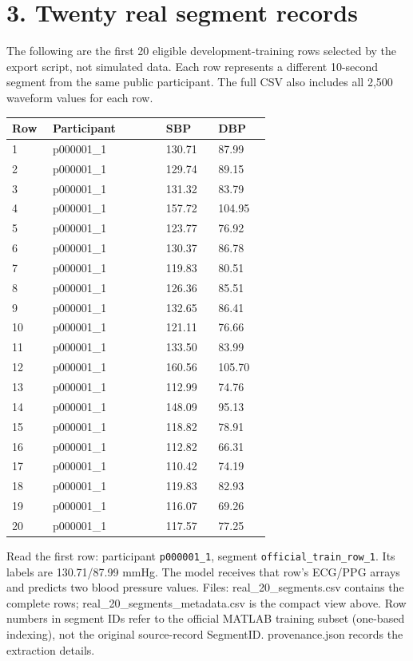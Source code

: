 \documentclass[11pt,letterpaper]{article}
\begin{document}
\section*{3. Twenty real segment records}
The following are the first 20 eligible development-training rows selected by the export script, not simulated data. Each row represents a different 10-second segment from the same public participant. The full CSV also includes all 2,500 waveform values for each row.

\par\smallskip
\begin{tabular}{@{}p{0.14\linewidth}p{0.39\linewidth}p{0.18\linewidth}p{0.18\linewidth}@{}}\toprule
Row & Participant & SBP & DBP\\\midrule
1 & p000001\_1 & 130.71 & 87.99\\
2 & p000001\_1 & 129.74 & 89.15\\
3 & p000001\_1 & 131.32 & 83.79\\
4 & p000001\_1 & 157.72 & 104.95\\
5 & p000001\_1 & 123.77 & 76.92\\
6 & p000001\_1 & 130.37 & 86.78\\
7 & p000001\_1 & 119.83 & 80.51\\
8 & p000001\_1 & 126.36 & 85.51\\
9 & p000001\_1 & 132.65 & 86.41\\
10 & p000001\_1 & 121.11 & 76.66\\
11 & p000001\_1 & 133.50 & 83.99\\
12 & p000001\_1 & 160.56 & 105.70\\
13 & p000001\_1 & 112.99 & 74.76\\
14 & p000001\_1 & 148.09 & 95.13\\
15 & p000001\_1 & 118.82 & 78.91\\
16 & p000001\_1 & 112.82 & 66.31\\
17 & p000001\_1 & 110.42 & 74.19\\
18 & p000001\_1 & 119.83 & 82.93\\
19 & p000001\_1 & 116.07 & 69.26\\
20 & p000001\_1 & 117.57 & 77.25\\
\bottomrule\end{tabular}\par\smallskip

Read the first row: participant \texttt{p000001\_1}, segment \texttt{official\_train\_row\_1}. Its labels are 130.71/87.99 mmHg. The model receives that row's ECG/PPG arrays and predicts two blood pressure values.
Files: real\_20\_segments.csv contains the complete rows; real\_20\_segments\_metadata.csv is the compact view above. Row numbers in segment IDs refer to the official MATLAB training subset (one-based indexing), not the original source-record SegmentID. provenance.json records the extraction details.\newpage
\end{document}
